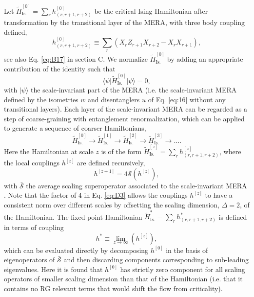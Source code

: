 \documentclass[aps,prl,twocolumn,showpacs,superscriptaddress,floatfix,10pt]{revtex4-1}
\newcommand{\bra}[1]{\mbox{$\langle #1 |$}}
\newcommand{\ket}[1]{\mbox{$| #1 \rangle$}}
\begin{document}
Let $\tilde H_\textrm{Is.}^{[0]}=\sum\nolimits_r h_{(r,r+1,r+2)}^{[0]}$ be the critical Ising Hamiltonian after transformation by the transitional layer of the MERA, with three body coupling defined,
\begin{equation}
h_{(r,r+1,r+2)}^{[0]} \equiv \sum\limits_r {\left( {{X_r}{Z_{r + 1}}{X_{r + 2}} - {X_r}{X_{r + 1}}} \right)}, \label{eq:D0}
\end{equation}
see also Eq. \ref{eq:B17} in section C. We normalize $\tilde H_\textrm{Is.}^{[0]}$ by adding an appropriate contribution of the identity such that
\begin{equation}
\bra{\psi} \tilde H_\textrm{Is.}^{[0]} \ket{\psi} = 0, \label{eq:D1}
\end{equation}
with $\ket{\psi}$ the scale-invariant part of the MERA (i.e. the scale-invariant MERA defined by the isometries $w$ and disentanglers $u$ of Eq. \ref{eq:16} without any transitional layers). Each layer of the scale-invariant MERA can be regarded as a step of coarse-graining with entanglement renormalization, which can be applied to generate a sequence of coarser Hamiltonians,  
\begin{equation}
\tilde H_\textrm{Is.}^{[0]} \to \tilde H_\textrm{Is.}^{[1]} \to \tilde H_\textrm{Is.}^{[2]} \to \tilde H_\textrm{Is.}^{[3]} \to \ldots. \label{eq:D2}
\end{equation}
Here the Hamiltonian at scale $z$ is of the form $\tilde H_\textrm{Is.}^{[z]}=\sum\nolimits_r h_{(r,r+1,r+2)}^{[z]}$, where the local couplings $h^{[z]}$ are defined recursively, 
\begin{equation}
h^{[z+1]} = 4\bar{\mathcal{S}} \left(  h^{[z]} \right), \label{eq:D3}
\end{equation}
with $\bar{\mathcal{S}}$ the average scaling superoperator associated to the scale-invariant MERA \cite{MERAbook}. Note that the factor of 4 in Eq. \ref{eq:D3} allows the couplings $h^{[z]}$ to have a consistent norm over different scales by offsetting the scaling dimension, $\Delta = 2$, of the Hamiltonian. The fixed point Hamiltonian $\tilde H_\textrm{Is.}^{*}=\sum\nolimits_r h_{(r,r+1,r+2)}^{*}$ is defined in terms of coupling
\begin{equation}
{h^*} \equiv \mathop {\lim }\limits_{z \to \infty } \left( {{h^{[z]}}} \right), \label{eq:D4}
\end{equation}
which can be evaluated directly by decomposing $h^{[0]}$ in the basis of eigenoperators of $\bar{\mathcal{S}}$ and then discarding components corresponding to sub-leading eigenvalues. Here it is found that $h^{[0]}$ has strictly zero component for all scaling operators of smaller scaling dimension than that of the Hamiltonian (i.e. that it contains no RG relevant terms that would shift the flow from criticality).
\end{document}
